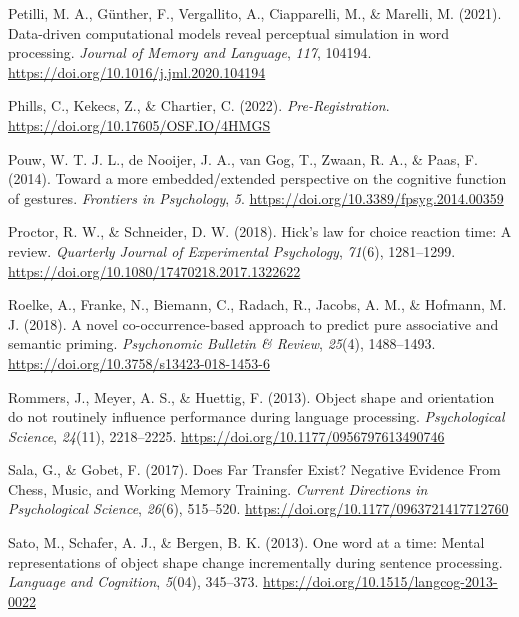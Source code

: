 \documentclass[
  man,mask,floatsintext]{apa7}
\newlength{\cslhangindent}
\newlength{\cslentryspacingunit} %
\newenvironment{CSLReferences}[2] %
 {%
  \setlength{\parindent}{0pt}
  \ifodd #1
  \let\oldpar\par
  \def\par{\hangindent=\cslhangindent\oldpar}
  \fi
  \setlength{\parskip}{#2\cslentryspacingunit}
 }%
 {}
\begin{document}
\begin{CSLReferences}{1}{0}
\leavevmode{}%
Petilli, M. A., Günther, F., Vergallito, A., Ciapparelli, M., \& Marelli, M. (2021). Data-driven computational models reveal perceptual simulation in word processing. \emph{Journal of Memory and Language}, \emph{117}, 104194. \url{https://doi.org/10.1016/j.jml.2020.104194}

\leavevmode{}%
Phills, C., Kekecs, Z., \& Chartier, C. (2022). \emph{Pre-{Registration}}. \url{https://doi.org/10.17605/OSF.IO/4HMGS}

\leavevmode{}%
Pouw, W. T. J. L., de Nooijer, J. A., van Gog, T., Zwaan, R. A., \& Paas, F. (2014). Toward a more embedded/extended perspective on the cognitive function of gestures. \emph{Frontiers in Psychology}, \emph{5}. \url{https://doi.org/10.3389/fpsyg.2014.00359}

\leavevmode{}%
Proctor, R. W., \& Schneider, D. W. (2018). Hick's law for choice reaction time: {A} review. \emph{Quarterly Journal of Experimental Psychology}, \emph{71}(6), 1281--1299. \url{https://doi.org/10.1080/17470218.2017.1322622}

\leavevmode{}%
Roelke, A., Franke, N., Biemann, C., Radach, R., Jacobs, A. M., \& Hofmann, M. J. (2018). A novel co-occurrence-based approach to predict pure associative and semantic priming. \emph{Psychonomic Bulletin \& Review}, \emph{25}(4), 1488--1493. \url{https://doi.org/10.3758/s13423-018-1453-6}

\leavevmode{}%
Rommers, J., Meyer, A. S., \& Huettig, F. (2013). Object shape and orientation do not routinely influence performance during language processing. \emph{Psychological Science}, \emph{24}(11), 2218--2225. \url{https://doi.org/10.1177/0956797613490746}

\leavevmode{}%
Sala, G., \& Gobet, F. (2017). Does Far Transfer Exist? Negative Evidence From Chess, Music, and Working Memory Training. \emph{Current Directions in Psychological Science}, \emph{26}(6), 515--520. \url{https://doi.org/10.1177/0963721417712760}

\leavevmode{}%
Sato, M., Schafer, A. J., \& Bergen, B. K. (2013). One word at a time: {Mental} representations of object shape change incrementally during sentence processing. \emph{Language and Cognition}, \emph{5}(04), 345--373. \url{https://doi.org/10.1515/langcog-2013-0022}


\end{CSLReferences}
\end{document}
